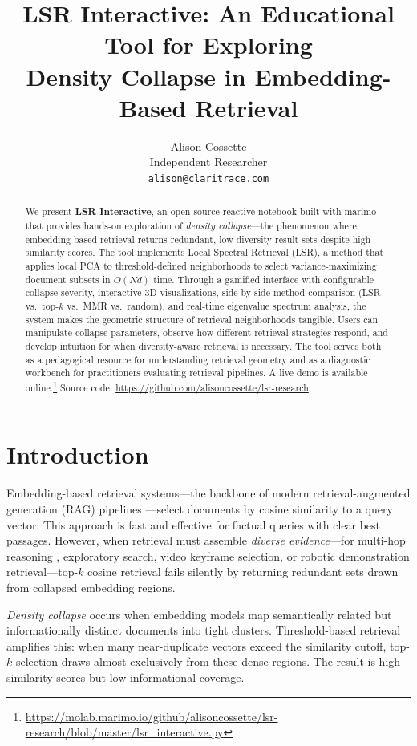\documentclass[11pt]{article}
\title{LSR Interactive: An Educational Tool for Exploring\\Density Collapse in Embedding-Based Retrieval}
\author{Alison Cossette \\
  Independent Researcher \\
  \texttt{alison@claritrace.com}}
\begin{document}
\maketitle

\begin{abstract}
We present \textbf{LSR Interactive}, an open-source reactive notebook built with marimo that provides hands-on exploration of \emph{density collapse}---the phenomenon where embedding-based retrieval returns redundant, low-diversity result sets despite high similarity scores. The tool implements Local Spectral Retrieval (LSR), a method that applies local PCA to threshold-defined neighborhoods to select variance-maximizing document subsets in $O(Nd)$ time. Through a gamified interface with configurable collapse severity, interactive 3D visualizations, side-by-side method comparison (LSR vs.\ top-$k$ vs.\ MMR vs.\ random), and real-time eigenvalue spectrum analysis, the system makes the geometric structure of retrieval neighborhoods tangible. Users can manipulate collapse parameters, observe how different retrieval strategies respond, and develop intuition for when diversity-aware retrieval is necessary. The tool serves both as a pedagogical resource for understanding retrieval geometry and as a diagnostic workbench for practitioners evaluating retrieval pipelines. A live demo is available online.\footnote{\url{https://molab.marimo.io/github/alisoncossette/lsr-research/blob/master/lsr_interactive.py}} Source code: \url{https://github.com/alisoncossette/lsr-research}
\end{abstract}

\section{Introduction}

Embedding-based retrieval systems---the backbone of modern retrieval-augmented generation (RAG) pipelines \citep{lewis2020rag, karpukhin2020dense}---select documents by cosine similarity to a query vector. This approach is fast and effective for factual queries with clear best passages. However, when retrieval must assemble \emph{diverse evidence}---for multi-hop reasoning \citep{yang2018hotpotqa}, exploratory search, video keyframe selection, or robotic demonstration retrieval---top-$k$ cosine retrieval fails silently by returning redundant sets drawn from collapsed embedding regions.

\emph{Density collapse} occurs when embedding models map semantically related but informationally distinct documents into tight clusters. Threshold-based retrieval amplifies this: when many near-duplicate vectors exceed the similarity cutoff, top-$k$ selection draws almost exclusively from these dense regions. The result is high similarity scores but low informational coverage.
\end{document}
